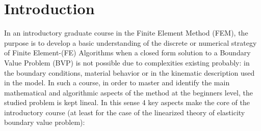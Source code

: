 %
\chapter{Introduction}

In an introductory graduate course in the Finite Element Method (FEM), the purpose is to develop a basic understanding of the discrete or numerical strategy of Finite Element-(FE) Algorithms when a closed form solution to a Boundary Value Problem (BVP) is not possible due to complexities existing probably: in the boundary conditions, material behavior or in the kinematic description used in the model. In such a course, in order to master and identify the main mathematical and algorithmic aspects of the method at the beginners level, the studied problem is kept lineal. In this sense 4 key aspects make the core of the introductory course (at least for the case of the linearized theory of elasticity boundary value problem):

